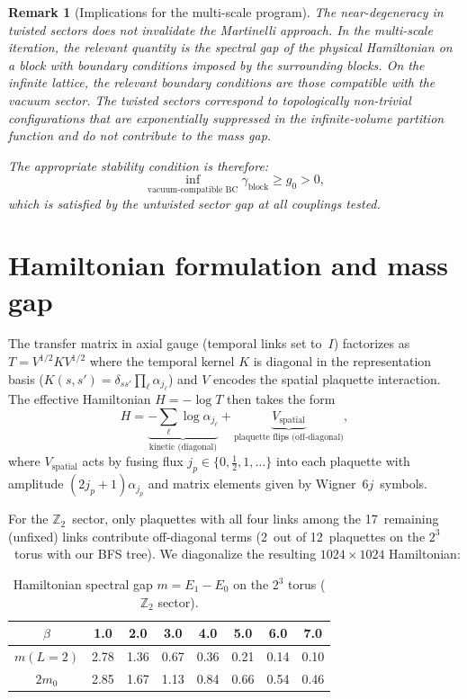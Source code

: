 \documentclass[12pt,a4paper]{article}
\newtheorem{remark}[theorem]{Remark}
\newcommand{\Z}{\mathbb{Z}}
\newcommand{\half}{\tfrac{1}{2}}
\begin{document}
\begin{remark}[Implications for the multi-scale program]
The near-degeneracy in twisted sectors does not invalidate the Martinelli approach. In the multi-scale iteration, the relevant quantity is the spectral gap \emph{of the physical Hamiltonian on a block with boundary conditions imposed by the surrounding blocks}. On the infinite lattice, the relevant boundary conditions are those compatible with the vacuum sector. The twisted sectors correspond to topologically non-trivial configurations that are exponentially suppressed in the infinite-volume partition function and do not contribute to the mass gap.

The appropriate stability condition is therefore:
\begin{equation}\label{eq:vacuum_stability}
\inf_{\text{vacuum-compatible BC}} \gamma_{\mathrm{block}} \ge g_0 > 0,
\end{equation}
which is satisfied by the untwisted sector gap at all couplings tested.
\end{remark}

\section{Hamiltonian formulation and mass gap}\label{sec:hamiltonian}

The transfer matrix in axial gauge (temporal links set to~$I$) factorizes as $T=V^{1/2}KV^{1/2}$ where the temporal kernel $K$ is diagonal in the representation basis ($K(s,s')=\delta_{ss'}\prod_\ell\alpha_{j_\ell}$) and $V$ encodes the spatial plaquette interaction. The effective Hamiltonian $H=-\log T$ then takes the form
\begin{equation}
H = \underbrace{-\sum_\ell\log\alpha_{j_\ell}}_{\text{kinetic (diagonal)}} + \underbrace{V_{\mathrm{spatial}}}_{\text{plaquette flips (off-diagonal)}},
\end{equation}
where $V_{\mathrm{spatial}}$ acts by fusing flux $j_p\in\{0,\half,1,\ldots\}$ into each plaquette with amplitude $(2j_p{+}1)\alpha_{j_p}$ and matrix elements given by Wigner~6$j$~symbols.

For the $\Z_2$~sector, only plaquettes with all four links among the 17~remaining (unfixed) links contribute off-diagonal terms (2~out of 12~plaquettes on the $2^3$~torus with our BFS tree). We diagonalize the resulting $1024\times 1024$ Hamiltonian:

\begin{table}[ht]
\centering
\caption{Hamiltonian spectral gap $m=E_1-E_0$ on the $2^3$ torus ($\Z_2$ sector).}
\label{tab:hamiltonian}
\begin{tabular}{@{}cccccccc@{}}
\toprule
$\beta$ & 1.0 & 2.0 & 3.0 & 4.0 & 5.0 & 6.0 & 7.0 \\
\midrule
$m(L{=}2)$ & 2.78 & 1.36 & 0.67 & 0.36 & 0.21 & 0.14 & 0.10 \\
$2m_0$ & 2.85 & 1.67 & 1.13 & 0.84 & 0.66 & 0.54 & 0.46 \\
\bottomrule
\end{tabular}
\end{table}
\end{document}
